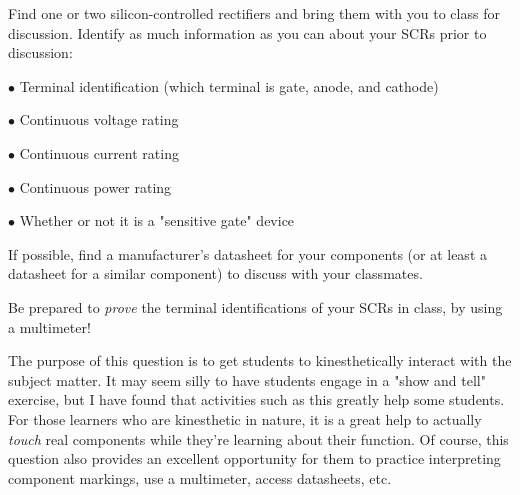 

Find one or two silicon-controlled rectifiers and bring them with you to class for discussion.  Identify as much information as you can about your SCRs prior to discussion:

\medskip
\item{$\bullet$} Terminal identification (which terminal is gate, anode, and cathode)
\item{$\bullet$} Continuous voltage rating
\item{$\bullet$} Continuous current rating
\item{$\bullet$} Continuous power rating
\item{$\bullet$} Whether or not it is a "sensitive gate" device
\medskip







If possible, find a manufacturer's datasheet for your components (or at least a datasheet for a similar component) to discuss with your classmates.

Be prepared to {\it prove} the terminal identifications of your SCRs in class, by using a multimeter!







The purpose of this question is to get students to kinesthetically interact with the subject matter.  It may seem silly to have students engage in a "show and tell" exercise, but I have found that activities such as this greatly help some students.  For those learners who are kinesthetic in nature, it is a great help to actually {\it touch} real components while they're learning about their function.  Of course, this question also provides an excellent opportunity for them to practice interpreting component markings, use a multimeter, access datasheets, etc.




